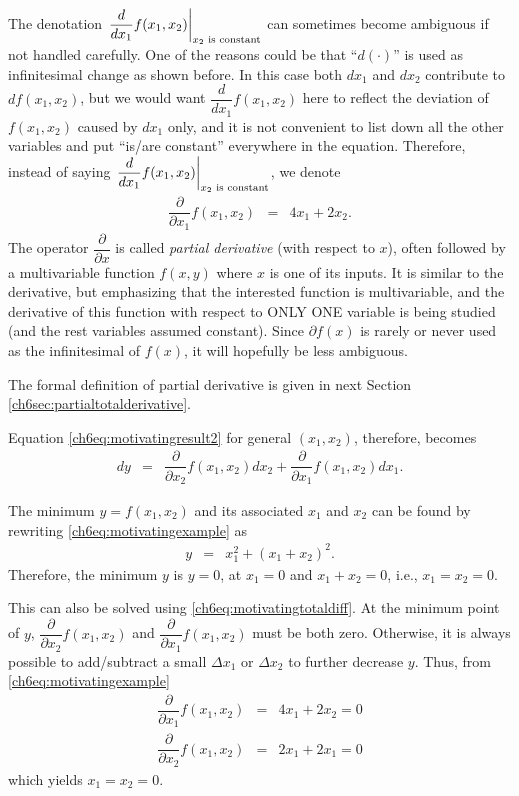 The denotation $\left.\dfrac{d}{dx_1}f(x_1,x_2)\right|_{x_2 \textup{~is constant}}$ can sometimes become ambiguous if not handled carefully. One of the reasons could be that ``$d(\cdot)$'' is used as infinitesimal change as shown before. In this case both $dx_1$ and $dx_2$ contribute to $df(x_1,x_2)$, but we would want $\dfrac{d}{dx_1}f(x_1,x_2)$ here to reflect the deviation of $f(x_1,x_2)$ caused by $dx_1$ only, and it is not convenient to list down all the other variables and put ``is/are constant'' everywhere in the equation. Therefore, instead of saying $\left.\dfrac{d}{dx_1}f(x_1,x_2)\right|_{x_2 \textup{~is constant}}$, we denote
\begin{eqnarray}
	\dfrac{\partial}{\partial x_1} f(x_1, x_2) &=& 4x_1 + 2x_2. \nonumber
\end{eqnarray}
The operator $\dfrac{\partial}{\partial x}$ is called \textit{partial derivative} (with respect to $x$), often followed by a multivariable function $f(x,y)$ where $x$ is one of its inputs. It is similar to the derivative, but emphasizing that the interested function is multivariable, and the derivative of this function with respect to ONLY ONE variable is being studied (and the rest variables assumed constant). Since $\partial f(x)$ is rarely or never used as the infinitesimal of $f(x)$, it will hopefully be less ambiguous.

The formal definition of partial derivative is given in next Section \ref{ch6sec:partialtotalderivative}.

Equation \eqref{ch6eq:motivatingresult2} for general $(x_1,x_2)$, therefore, becomes
\begin{eqnarray}
	d y &=& \dfrac{\partial}{\partial x_2}f(x_1,x_2) d x_2 + \dfrac{\partial}{\partial x_1}f(x_1,x_2) d x_1. \label{ch6eq:motivatingtotaldiff}
\end{eqnarray}

The minimum $y=f(x_1,x_2)$ and its associated $x_1$ and $x_2$ can be found by rewriting \eqref{ch6eq:motivatingexample} as
\begin{eqnarray}
	y &=& x_1^2 + \left(x_1 + x_2\right)^2. \nonumber
\end{eqnarray}
Therefore, the minimum $y$ is $y=0$, at $x_1 = 0$ and $x_1 + x_2 = 0$, i.e., $x_1 = x_2 = 0$.

This can also be solved using \eqref{ch6eq:motivatingtotaldiff}. At the minimum point of $y$, $\dfrac{\partial}{\partial x_2}f(x_1,x_2)$ and $\dfrac{\partial}{\partial x_1}f(x_1,x_2)$ must be both zero. Otherwise, it is always possible to add/subtract a small $\Delta x_1$ or $\Delta x_2$ to further decrease $y$. Thus, from \eqref{ch6eq:motivatingexample}
\begin{eqnarray}
	\dfrac{\partial}{\partial x_1}f(x_1,x_2) &=& 4x_1 + 2x_2 = 0 \nonumber \\
	\dfrac{\partial}{\partial x_2}f(x_1,x_2) &=& 2x_1 + 2x_1 = 0 \nonumber
\end{eqnarray}
which yields $x_1=x_2=0$.

